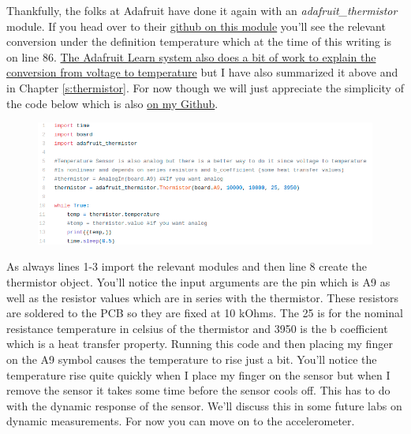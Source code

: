{Thankfully, the
folks at Adafruit have done it again with an {\it
adafruit\_thermistor} module. If you head over to
their \href{https://github.com/adafruit/Adafruit_CircuitPython_Thermistor/blob/master/adafruit_thermistor.py}{github
on this module} you’ll see the relevant conversion under the
definition temperature which at the time of this writing is on line
86. \href{https://learn.adafruit.com/thermistor/circuitpython}{The
Adafruit Learn system also does a bit of work to explain the
conversion from voltage to temperature} but I have also summarized it above and in Chapter \ref{s:thermistor}. For now though we will just
appreciate the simplicity of the code below which is
also \href{https://github.com/cmontalvo251/Microcontrollers/blob/master/Circuit_Playground/CircuitPython/Temp/record_temperature_thermistor.py}{on
my Github}. 
\begin{figure}[H]
  \begin{center}
    \includegraphics[width=\textwidth]{Figures/thermistor_code.png}
  \end{center}
\end{figure}
As always lines 1-3 import the relevant modules and then line 8 create
the thermistor object. You’ll notice the input arguments are the pin
which is A9 as well as the resistor values which are in series with
the thermistor. These resistors are soldered to the PCB so they are
fixed at 10 kOhms. The 25 is for the nominal resistance temperature in
celsius of the thermistor and 3950 is the b coefficient which is a
heat transfer property. Running this code and then placing my finger
on the A9 symbol causes the temperature to rise just a bit. You’ll
notice the temperature rise quite quickly when I place my finger on
the sensor but when I remove the sensor it takes some time before the
sensor cools off. This has to do with the dynamic response of the
sensor. We’ll discuss this in some future labs on dynamic
measurements. For now you can move on to the accelerometer. 
\begin{figure}[H]
  \begin{center}

\end{center}
\end{figure}}
